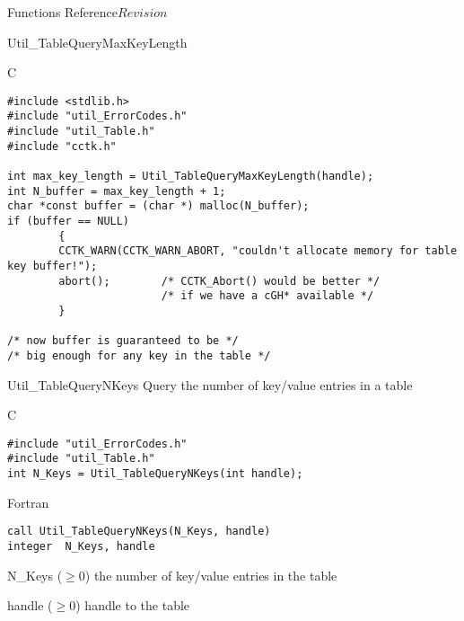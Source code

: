 \begin{cactuspart}{ Functions Reference}{}{$Revision$}
\begin{FunctionDescription}{Util\_TableQueryMaxKeyLength}
\begin{ExampleSection}
\begin{Example}{C}
\begin{verbatim}
#include <stdlib.h>
#include "util_ErrorCodes.h"
#include "util_Table.h"
#include "cctk.h"

int max_key_length = Util_TableQueryMaxKeyLength(handle);
int N_buffer = max_key_length + 1;
char *const buffer = (char *) malloc(N_buffer);
if (buffer == NULL)
        {
        CCTK_WARN(CCTK_WARN_ABORT, "couldn't allocate memory for table key buffer!");
        abort();        /* CCTK_Abort() would be better */
                        /* if we have a cGH* available */
        }

/* now buffer is guaranteed to be */
/* big enough for any key in the table */
\end{verbatim}
\end{Example}
\end{ExampleSection}
\end{FunctionDescription}


\begin{FunctionDescription}{Util\_TableQueryNKeys}
\label{Util-TableQueryNKeys}
Query the number of key/value entries in a table

\begin{SynopsisSection}
\begin{Synopsis}{C}
\begin{verbatim}
#include "util_ErrorCodes.h"
#include "util_Table.h"
int N_Keys = Util_TableQueryNKeys(int handle);
\end{verbatim}
\end{Synopsis}
\begin{Synopsis}{Fortran}
\begin{verbatim}
call Util_TableQueryNKeys(N_Keys, handle)
integer  N_Keys, handle
\end{verbatim}
\end{Synopsis}
\end{SynopsisSection}

\begin{ResultSection}
\begin{Result}{N\_Keys ($\ge 0$)}
the number of key/value entries in the table
\end{Result}
\end{ResultSection}

\begin{ParameterSection}
\begin{Parameter}{handle ($\ge 0$)}
handle to the table
\end{Parameter}
\end{ParameterSection}


\end{FunctionDescription}
\end{cactuspart}
